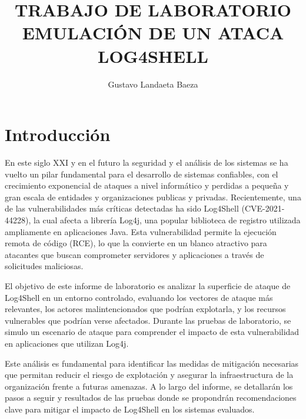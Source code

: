 \documentclass[stu, 11pt, letterpaper, donotrepeattitle, floatsintext, natbib]{apa7}
\title{\Large  TRABAJO DE LABORATORIO \\ EMULACIÓN DE UN ATACA LOG4SHELL}
\author{Gustavo Landaeta Baeza } %
\begin{document}
\maketitle


\renewcommand\contentsname{\largeÍndice}
\tableofcontents
\setcounter{tocdepth}{2}
\newpage
\renewcommand{\listfigurename}{\large Índice de fíguras}
\listoffigures
\newpage
\renewcommand{\listtablename}{\largeÍndice de tablas}
\listoftables
\newpage


\section{\large Introducción}

\justify

\hspace{1.27cm} En este siglo XXI y en el futuro la seguridad y el análisis de los sistemas se ha vuelto un pilar fundamental para el desarrollo de sistemas confiables, con el crecimiento exponencial de ataques a nivel informático y perdidas a pequeña y gran escala de entidades y organizaciones publicas y privadas. Recientemente, una de las vulnerabilidades más críticas detectadas ha sido Log4Shell (CVE-2021-44228), la cual afecta a librería Log4j, una popular biblioteca de registro utilizada ampliamente en aplicaciones Java. Esta vulnerabilidad permite la ejecución remota de código (RCE), lo que la convierte en un blanco atractivo para atacantes que buscan comprometer servidores y aplicaciones a través de solicitudes maliciosas.

El objetivo de este informe de laboratorio es analizar la superficie de ataque de Log4Shell en un entorno controlado, evaluando los vectores de ataque más relevantes, los actores malintencionados que podrían explotarla, y los recursos vulnerables que podrían verse afectados. Durante las pruebas de laboratorio, se simulo un escenario de ataque para comprender el impacto de esta vulnerabilidad en aplicaciones que utilizan Log4j.

Este análisis es fundamental para identificar las medidas de mitigación necesarias que permitan reducir el riesgo de explotación y asegurar la infraestructura de la organización frente a futuras amenazas. A lo largo del informe, se detallarán los pasos a seguir y resultados de las pruebas donde se propondrán recomendaciones clave para mitigar el impacto de Log4Shell en los sistemas evaluados.
\end{document}
